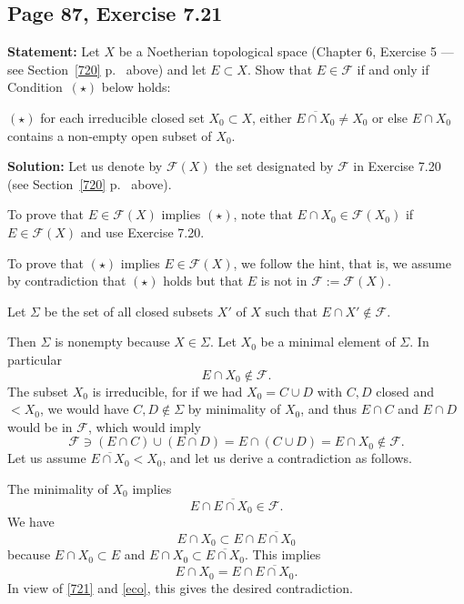\documentclass[parskip=half,fontsize=12pt]{scrartcl}%
\begin{document}
\subsection{Page 87, Exercise 7.21}%

\textbf{Statement:} Let $X$ be a Noetherian topological space (Chapter 6, Exercise 5 --- see Section~\ref{720} p.~\pageref{720} above) and let $E\subset X$. Show that $E\in\mathcal F$ if and only if Condition~$(\star)$ below holds: 

$(\star)$ for each irreducible closed set $X_0\subset X$, either $\overline{E\cap X_0}\ne X_0$ or else $E\cap X_0$ contains a non-empty open subset of $X_0$.%

\textbf{Solution:} Let us denote by $\mathcal F(X)$ the set designated by $\mathcal F$ in Exercise 7.20 (see Section~\ref{720} p.~\pageref{720} above). 

To prove that $E\in\mathcal F(X)$ implies $(\star)$, %
note that $E\cap X_0\in\mathcal F(X_0)$ if $E\in\mathcal F(X)$ and use Exercise 7.20.


To prove that $(\star)$ implies $E\in\mathcal F(X)$, %
we follow the hint, that is, we assume by contradiction that $(\star)$ holds but that $E$ is not in $\mathcal F:=\mathcal F(X)$.

Let $\Sigma$ be the set of all closed subsets $X'$ of $X$ such that $E\cap X'\notin\mathcal F$. 

Then $\Sigma$ is nonempty because %
$X\in\Sigma$. Let $X_0$ be a minimal element of $\Sigma$. In particular 
%
\begin{equation}\label{721}
E\cap X_0\notin\mathcal F.
\end{equation}
%  
The subset $X_0$ is irreducible, for if we had $X_0=C\cup D$ with $C,D$ closed and $<X_0$, we would have $C,D\notin\Sigma$ by minimality of $X_0$, and thus $E\cap C$ and $E\cap D$ would be in $\mathcal F$, which would imply 
$$
\mathcal F\ni(E\cap C)\cup(E\cap D)=E\cap(C\cup D)=E\cap X_0\notin\mathcal F.
$$ 
Let us assume $\overline{E\cap X_0}<X_0$, and let us derive a contradiction as follows. 

The minimality of $X_0$ implies 
\begin{equation}\label{eco}%
E\cap\overline{E\cap X_0}\in\mathcal F.
\end{equation}
We have 
$$
E\cap X_0\subset E\cap\overline{E\cap X_0}
$$ 
because $E\cap X_0\subset E$ and $E\cap X_0\subset\overline{E\cap X_0}$. This implies 
$$
E\cap X_0=E\cap\overline{E\cap X_0}.
$$ 
In view of \eqref{721} and \eqref{eco}, this gives the desired contradiction.
\end{document}
